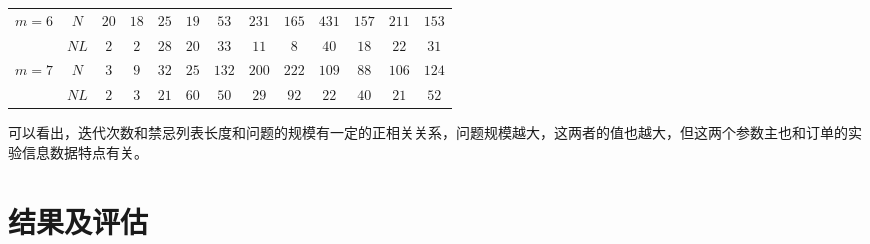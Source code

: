 \begin{table}[h]
{\begin{tabularx}{123mm}{ccccccccccccc}
\multirow{2}[0]{*}{$m=6$}&$N$& $20$    & $18$    & $25$    & $19$    & $53$   & $231$   & $165$   & $431$    &  $157 $   &  $211 $ &$153$  \\
                & $NL$ & $2$     & $2$      & $28$     & $20$    & $33$    & $11$     & $8$     & $40$   & $18$    & $22$   & $31$ \\
\multirow{2}[0]{*}{$m=7$}& $N$& $3$     & $9$    &$ 32    $    &$ 25 $  &$ 132  $&$ 200   $&$ 222   $&$ 109   $&$88     $   & $   106 $&$124  $\\
              &$ NL    $&$ 2     $&$ 3     $&$ 21     $&$ 60   $  &  $50   $  &  $29 $ &$ 92   $  &$ 22    $&$ 40   $   &$ 21   $&$ 52 $\\
\bottomrule
\end{tabularx}}
\label{tab:modelpara}
\end{table}

可以看出，迭代次数和禁忌列表长度和问题的规模有一定的正相关关系，问题规模越大，这两者的值也越大，但这两个参数主也和订单的实验信息数据特点有关。
 
\section{结果及评估}
